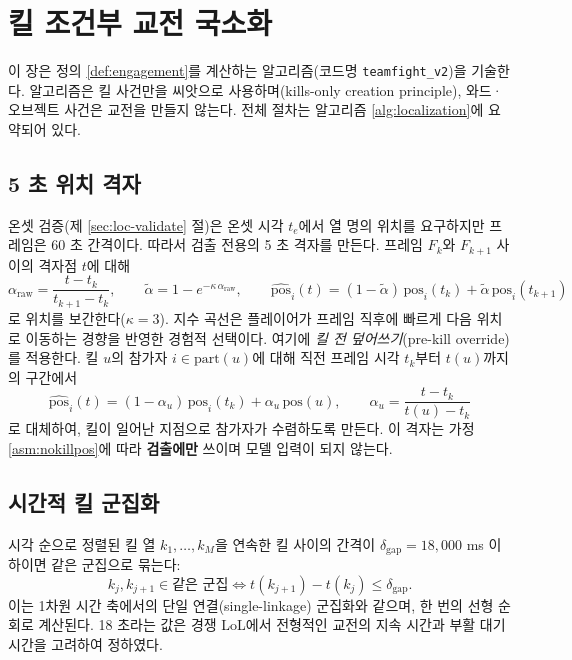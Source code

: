 \chapter{킬 조건부 교전 국소화}
\label{ch:localization}

이 장은 정의 \ref{def:engagement}를 계산하는 알고리즘(코드명 \texttt{teamfight\_v2})을 기술한다. 알고리즘은 킬 사건만을 씨앗으로 사용하며(kills-only creation principle), 와드·오브젝트 사건은 교전을 만들지 않는다. 전체 절차는 알고리즘 \ref{alg:localization}에 요약되어 있다.

\section{5 초 위치 격자}
\label{sec:loc-grid}

온셋 검증(제 \ref{sec:loc-validate} 절)은 온셋 시각 $t_e$에서 열 명의 위치를 요구하지만 프레임은 60 초 간격이다. 따라서 검출 전용의 5 초 격자를 만든다. 프레임 $F_k$와 $F_{k+1}$ 사이의 격자점 $t$에 대해
\begin{equation}
  \alpha_{\mathrm{raw}} = \frac{t - t_k}{t_{k+1} - t_k}, \qquad
  \tilde{\alpha} = 1 - e^{-\kappa\,\alpha_{\mathrm{raw}}}, \qquad
  \widehat{\mathrm{pos}}_i(t) = (1-\tilde\alpha)\,\mathrm{pos}_i(t_k) + \tilde\alpha\,\mathrm{pos}_i(t_{k+1})
  \label{eq:interp}
\end{equation}
로 위치를 보간한다($\kappa = 3$). 지수 곡선은 플레이어가 프레임 직후에 빠르게 다음 위치로 이동하는 경향을 반영한 경험적 선택이다. 여기에 \emph{킬 전 덮어쓰기}(pre-kill override)를 적용한다. 킬 $u$의 참가자 $i \in \mathrm{part}(u)$에 대해 직전 프레임 시각 $t_k$부터 $t(u)$까지의 구간에서
\begin{equation}
  \widehat{\mathrm{pos}}_i(t) = (1-\alpha_u)\,\mathrm{pos}_i(t_k) + \alpha_u\,\mathrm{pos}(u), \qquad \alpha_u = \frac{t - t_k}{t(u) - t_k}
\end{equation}
로 대체하여, 킬이 일어난 지점으로 참가자가 수렴하도록 만든다. 이 격자는 가정 \ref{asm:nokillpos}에 따라 \textbf{검출에만} 쓰이며 모델 입력이 되지 않는다.

\section{시간적 킬 군집화}
\label{sec:loc-temporal}

시각 순으로 정렬된 킬 열 $k_1, \dots, k_M$을 연속한 킬 사이의 간격이 $\delta_{\mathrm{gap}} = 18{,}000$ ms 이하이면 같은 군집으로 묶는다:
\begin{equation}
  k_j, k_{j+1} \in \text{같은 군집} \iff t(k_{j+1}) - t(k_j) \le \delta_{\mathrm{gap}}.
\end{equation}
이는 1차원 시간 축에서의 단일 연결(single-linkage) 군집화와 같으며, 한 번의 선형 순회로 계산된다. 18 초라는 값은 경쟁 LoL에서 전형적인 교전의 지속 시간과 부활 대기시간을 고려하여 정하였다.

